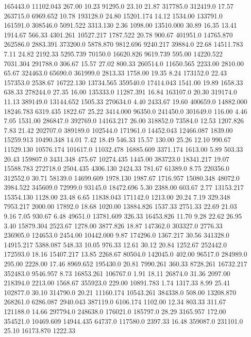 165443.0 11102.043 267.00 10.23 91295.0 23.10 21.87 317785.0 312419.0 17.57 
263715.0 6969.652 10.78 193128.0 24.80 15201.174 14.12 1534.00 133791.0 161591.0 
308546.0 5091.522 3313.130 2.36 1098.00 13510.000 30.89 16.35 13.41 1914.67 
566.33 4301.261 10527.217 1787.522 20.78 900.67 401951.0 14765.870 262586.0 2883.391 
373200.0 5878.870 9812.696 9240.217 39884.0 22.68 14511.783 7.11 24.82 2192.33 
5295.739 70150.0 16620.826 9619.739 595.00 14220.522 7031.304 291788.0 306.67 15.57 
27.02 800.33 260514.0 11650.565 2233.00 2810.00 65.67 324463.0 65690.0 361999.0 
2813.33 1758.00 19.35 8.24 173152.0 22.43 157353.0 2538.67 16722.130 13734.565 
359540.0 17414.043 1541.00 19.89 1658.33 638.33 278244.0 27.35 16.00 135333.0 
11287.391 16.84 163107.0 20.30 319174.0 11.13 389149.0 13144.652 1505.33 270634.0 
4.40 2433.67 19.60 400659.0 14882.000 18246.783 6319.435 1822.67 25.22 3414.000 
96350.0 241450.0 301649.0 116.00 4.46 7.05 1531.00 286847.0 392769.0 14163.217 
26.00 318852.0 73584.0 12.53 1207.826 7.83 21.42 202707.0 389189.0 102544.0 
171961.0 14452.043 12466.087 1839.00 15259.913 10490.348 14.01 7.42 18.49 546.33 
15.57 130.00 25.26 12.10 990.67 11529.130 10576.174 101617.0 11032.478 16885.609 
3371.174 1613.00 5.89 503.33 20.43 159807.0 3431.348 475.67 10274.435 1445.00 
383723.0 18341.217 19.07 15588.783 272718.0 2504.435 4306.130 2424.33 781.67 61389.0 
8.75 220356.0 312552.0 30.71 58139.0 14699.609 1978.130 1987.67 1716.957 15080.348 
48072.0 3984.522 345609.0 72999.0 93145.0 18472.696 5.30 2388.00 603.67 2.77 
13153.217 15354.130 1128.00 23.48 6.65 11838.043 171142.0 1213.00 20.24 7.19 
329.348 7953.217 2000.00 17892.0 18.68 1020.00 13884.826 1537.33 2751.33 22.69 
21.03 9.16 7.05 930.67 6.48 49651.0 13781.609 326.33 16453.826 11.70 
9.28 22.62 26.95 3.40 15879.304 2523.67 1278.00 3877.826 18.87 147362.0 
303327.0 2776.33 236905.0 124653.0 2454.00 10442.000 9.87 174296.0 1367.217 30.56 
341328.0 14915.217 5388.087 548.33 10.05 976.33 12.61 30.12 20.84 1252.67 
252442.0 172593.0 18.16 15407.217 13.85 2268.67 80504.0 142045.0 402.00 96517.0 
284989.0 295.00 2228.00 17.46 8969.652 195430.0 20.81 7990.261 360.33 8728.261 
16732.217 352483.0 9546.957 8.73 16853.261 106767.0 1.91 18.11 26874.0 31.36 
2097.00 218394.0 2213.00 1568.67 355923.0 229.00 10891.783 1.74 1317.33 8.99 
25.41 102877.0 30.10 314790.0 20.21 11160.174 10543.261 384338.0 508.00 13208.870 
268261.0 6286.087 2940.043 387119.0 6106.174 1102.00 12.34 803.33 311.67 121188.0 
14.66 297794.0 248638.0 176021.0 185797.0 28.29 3165.957 172.00 354521.0 10469.609 
14944.435 64737.0 117580.0 2397.33 16.48 359087.0 231101.0 25.10 16173.870 1222.33 
